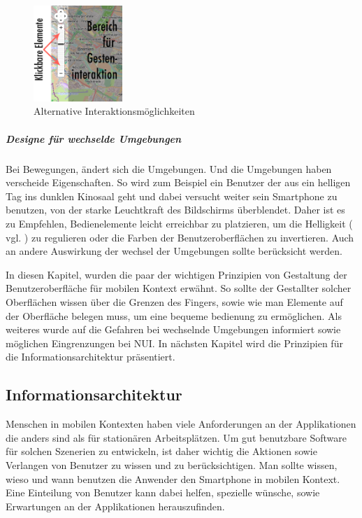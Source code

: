\begin{figure}
	\begin{center}
	
	\includegraphics[width=0.3\textwidth]{img/NUIbsp.png}
	\caption{Alternative Interaktionsmöglichkeiten}\label{fig:nuibsp}
\end{center}
\end{figure}

\subparagraph{Designe für wechselde Umgebungen} %
\label{subp:designe_f_r_au_eneinsatz}

Bei Bewegungen, ändert sich die Umgebungen. Und die Umgebungen haben verscheide Eigenschaften. So wird zum Beispiel ein Benutzer der aus ein helligen Tag ins dunklen Kinosaal geht und dabei versucht weiter sein Smartphone zu benutzen,  von der starke Leuchtkraft des Bildschirms überblendet. Daher ist es zu Empfehlen, Bedienelemente leicht erreichbar zu platzieren, um die Helligkeit ( vgl. \cite[ff Seite 418]{mobileInteraces}) zu regulieren oder die Farben der Benutzeroberflächen zu invertieren. Auch an andere Auswirkung der wechsel der Umgebungen sollte berücksicht werden.
\newline

In diesen Kapitel, wurden die paar der wichtigen Prinzipien von Gestaltung der Benutzeroberfläche für mobilen Kontext erwähnt. So sollte der Gestallter solcher Oberflächen wissen über die Grenzen des Fingers, sowie wie man Elemente auf der Oberfläche belegen muss, um eine bequeme bedienung zu ermöglichen. Als weiteres wurde auf die Gefahren bei wechselnde Umgebungen informiert sowie möglichen Eingrenzungen bei NUI. In nächsten Kapitel wird die Prinzipien für die Informationsarchitektur präsentiert.

\subsection{Informationsarchitektur}
\label{sec:Informationsaufbereitung}


Menschen in mobilen Kontexten haben viele Anforderungen an der Applikationen die anders sind als für stationären Arbeitsplätzen. Um gut benutzbare Software für solchen Szenerien zu entwickeln, ist daher wichtig die Aktionen sowie Verlangen von Benutzer zu wissen und zu berücksichtigen. Man sollte wissen, wieso und wann benutzen die Anwender den Smartphone in mobilen Kontext. Eine Einteilung von Benutzer kann dabei helfen, spezielle wünsche, sowie Erwartungen an der Applikationen herauszufinden.

